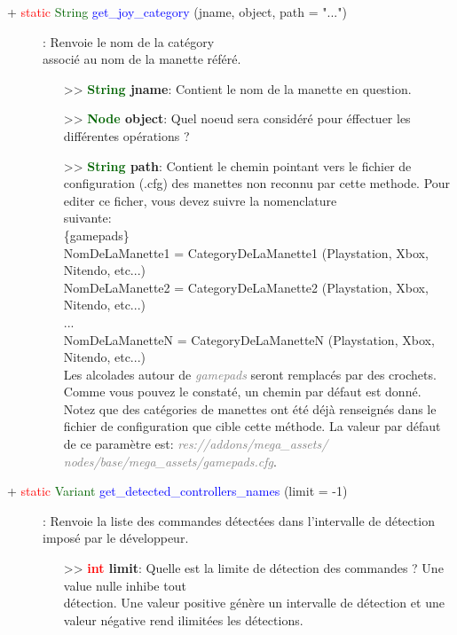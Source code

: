 \documentclass[a4paper, 11pt]{article}
\begin{document}
	\begin{description}
		\item [+ \textcolor{red}{static} \textcolor{darkgreen}{String} \textcolor{blue}{get\_joy\_category} 
		(jname, object, path = "...")]: Renvoie le nom de la catégory \\associé au nom de la manette référé.
		\begin{itemize}
			\item[>> \textbf{\textcolor{darkgreen}{String} jname}:] Contient le nom de la manette en 
			question.
			\item [>> \textbf{\textcolor{darkgreen}{Node} object}:] Quel noeud sera considéré pour éffectuer 
			les différentes opérations ?
			\item[>> \textbf{\textcolor{darkgreen}{String} path}:] Contient le chemin pointant vers le 
			fichier de configuration (.cfg) des manettes non reconnu par cette methode. Pour editer ce
			ficher, vous devez suivre la nomenclature \\suivante:\\
			\{gamepads\}\\
			NomDeLaManette1 = CategoryDeLaManette1 (Playstation, Xbox, Nitendo, etc...)\\
			NomDeLaManette2 = CategoryDeLaManette2 (Playstation, Xbox, Nitendo, etc...)\\
			...\\
			NomDeLaManetteN = CategoryDeLaManetteN (Playstation, Xbox, Nitendo, etc...)\\
			Les alcolades autour de \textit{\textcolor{gray}{gamepads}} seront remplacés par des crochets.
			Comme vous pouvez le constaté, un chemin par défaut est donné. Notez que des catégories de
			manettes ont été déjà renseignés dans le fichier de configuration que cible cette méthode.
			La valeur par défaut de ce paramètre est: \textit{\textcolor{gray}{res://addons/mega\_assets/
			nodes/base/mega\_assets/gamepads.cfg}}.\\
		\end{itemize}
	\end{description}
	\begin{description}
		\item [+ \textcolor{red}{static} \textcolor{darkgreen}{Variant} \textcolor{blue}
		{get\_detected\_controllers\_names} (limit = -1)]: Renvoie la liste des commandes détectées dans 
		l'intervalle de détection imposé par le développeur.
		\begin{itemize}
			\item[>> \textbf{\textcolor{red}{int} limit}:] Quelle est la limite de détection des commandes ?
			Une value nulle inhibe tout \\détection. Une valeur positive génère un intervalle de détection 
			et une valeur négative rend ilimitées les détections.\\
		\end{itemize}
	\end{description}
\end{document}
